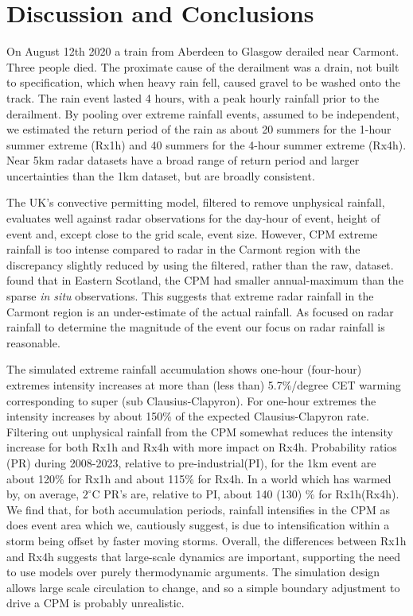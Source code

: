 \documentclass[11pt,a4paper]{article}
\begin{document}
\section{Discussion and Conclusions}
On August 12th 2020 a train from Aberdeen to Glasgow derailed near Carmont. Three people died. The proximate cause of the derailment was a drain, not built to specification, which when heavy rain fell, caused gravel  to be washed onto the track\parencite{carmontReport2024}. The rain event lasted 4 hours, with a peak hourly rainfall prior to the derailment. By pooling over extreme rainfall events, assumed to be independent, we  estimated the return period of the rain  as about 20 summers for the 1-hour summer extreme (Rx1h) and  40 summers for the 4-hour summer extreme (Rx4h). Near 5km radar datasets have a broad range of return period and larger uncertainties than the 1km dataset, but are broadly consistent. 

The UK's convective permitting model\parencite{kendon2023uk_cpm}, filtered to remove unphysical rainfall, evaluates  well against radar observations for the day-hour of  event, height of event and, except close to the grid scale, event size. However, CPM extreme rainfall is too intense compared to radar in the Carmont region with the discrepancy slightly reduced by using the filtered, rather than the raw,  dataset.  \cite{kendon2023uk_cpm} found that in Eastern Scotland, the CPM had smaller annual-maximum than the sparse \textit{in situ} observations. This suggests that extreme radar rainfall  in the Carmont region is an under-estimate of the actual rainfall.  As \cite{carmontReport2024} focused on radar rainfall  to determine the magnitude of the event our focus on radar rainfall is reasonable. 

The simulated extreme rainfall accumulation shows one-hour (four-hour) extremes intensity increases at more than (less than) 5.7\%/degree CET warming corresponding to  super (sub Clausius-Clapyron). For one-hour extremes the intensity increases by  about 150\% of the expected Clausius-Clapyron rate. Filtering out unphysical rainfall from the CPM somewhat reduces the intensity increase for both Rx1h and Rx4h with more impact on Rx4h.  Probability ratios (PR) during 2008-2023, relative to pre-industrial(PI), for the 1km event are about 120\% for Rx1h and about 115\%  for Rx4h.  In a world which has warmed by, on average, $2^\circ$C PR's are, relative to PI, about 140 (130) \% for Rx1h(Rx4h). We find that, for both accumulation periods, rainfall intensifies in the CPM as does event area which we, cautiously suggest, is due to intensification within a storm being offset by faster moving storms.   Overall, the differences between Rx1h and Rx4h  suggests that large-scale dynamics are important, supporting the need to use models over purely thermodynamic arguments. The simulation design allows large scale circulation to change, and so a simple boundary adjustment to drive a CPM is probably unrealistic.  
 
\end{document}
